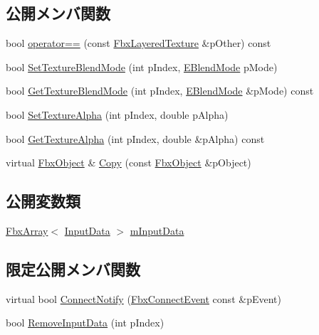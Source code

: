 \subsection*{公開メンバ関数}
\begin{DoxyCompactItemize}
\item 
bool \hyperlink{class_fbx_layered_texture_a8a01816e03ca531e7bdd8c65804febf7}{operator==} (const \hyperlink{class_fbx_layered_texture}{Fbx\+Layered\+Texture} \&p\+Other) const
\item 
bool \hyperlink{class_fbx_layered_texture_ae16a157ad7ff41d377a2cff885a00c80}{Set\+Texture\+Blend\+Mode} (int p\+Index, \hyperlink{class_fbx_layered_texture_af291d42b0329513909d2ddf48f56f5ba}{E\+Blend\+Mode} p\+Mode)
\item 
bool \hyperlink{class_fbx_layered_texture_ae0b5014964899ff448c859d408d8614a}{Get\+Texture\+Blend\+Mode} (int p\+Index, \hyperlink{class_fbx_layered_texture_af291d42b0329513909d2ddf48f56f5ba}{E\+Blend\+Mode} \&p\+Mode) const
\item 
bool \hyperlink{class_fbx_layered_texture_a87145db35c3a207f5e54c9a9dcd83f1f}{Set\+Texture\+Alpha} (int p\+Index, double p\+Alpha)
\item 
bool \hyperlink{class_fbx_layered_texture_a2d38e409c9671b2850d1260d881e1940}{Get\+Texture\+Alpha} (int p\+Index, double \&p\+Alpha) const
\item 
virtual \hyperlink{class_fbx_object}{Fbx\+Object} \& \hyperlink{class_fbx_layered_texture_a61ca1d210dcae83133ad2ee1c9c7daa9}{Copy} (const \hyperlink{class_fbx_object}{Fbx\+Object} \&p\+Object)
\end{DoxyCompactItemize}
\subsection*{公開変数類}
\begin{DoxyCompactItemize}
\item 
\hyperlink{class_fbx_array}{Fbx\+Array}$<$ \hyperlink{struct_fbx_layered_texture_1_1_input_data}{Input\+Data} $>$ \hyperlink{class_fbx_layered_texture_ae06d32684ea2f049c21abb66dfc30d4f}{m\+Input\+Data}
\end{DoxyCompactItemize}
\subsection*{限定公開メンバ関数}
\begin{DoxyCompactItemize}
\item 
virtual bool \hyperlink{class_fbx_layered_texture_a78ed9cd6298697060ebc278617d72d44}{Connect\+Notify} (\hyperlink{class_fbx_connect_event}{Fbx\+Connect\+Event} const \&p\+Event)
\item 
bool \hyperlink{class_fbx_layered_texture_a6d1190feade206649f73444c5b114bd1}{Remove\+Input\+Data} (int p\+Index)
\end{DoxyCompactItemize}
